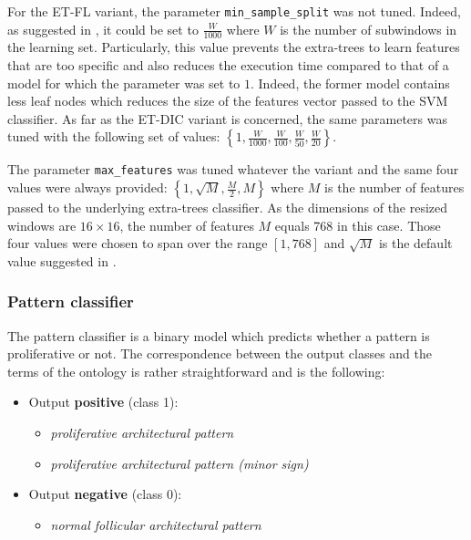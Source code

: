 For the ET-FL variant, the parameter \texttt{min\_sample\_split} was not tuned. Indeed, as suggested in \cite{Maree201617}, it could be set to $\frac{W}{1000}$ where $W$ is the number of subwindows in the learning set. Particularly, this value prevents the extra-trees to learn features that are too specific and also reduces the execution time compared to that of a model for which the parameter was set to $1$. Indeed, the former model contains less leaf nodes which reduces the size of the features vector passed to the SVM classifier. As far as the ET-DIC variant is concerned, the same parameters was tuned with the following set of values: $\left\{1, \frac{W}{1000}, \frac{W}{100}, \frac{W}{50}, \frac{W}{20} \right\}$.

The parameter \texttt{max\_features} was tuned whatever the variant and the same four values were always provided: $\left\{1, \sqrt{M}, \frac{M}{2}, M\right\}$ where $M$ is the number of features passed to the underlying extra-trees classifier. As the dimensions of the resized windows are $16\times 16$, the number of features $M$ equals 768 in this case. Those four values were chosen to span over the range $[1, 768]$ and $\sqrt{M}$ is the default value suggested in \cite{Geurts2006}. 

\subsubsection{Pattern classifier}
\label{sssec:thyroid_pattern_model}
The pattern classifier is a binary model which predicts whether a pattern is proliferative or not. The correspondence between the output classes and the terms of the ontology is rather straightforward and is the following:

\begin{itemize}
	\item Output \textbf{positive} (class 1): 
	\begin{itemize}
		\item \textit{proliferative architectural pattern}
		\item \textit{proliferative architectural pattern (minor sign)}
	\end{itemize}
	\item Output \textbf{negative} (class 0): 
	\begin{itemize}
		\item \textit{normal follicular architectural pattern}
	\end{itemize}		
\end{itemize}

